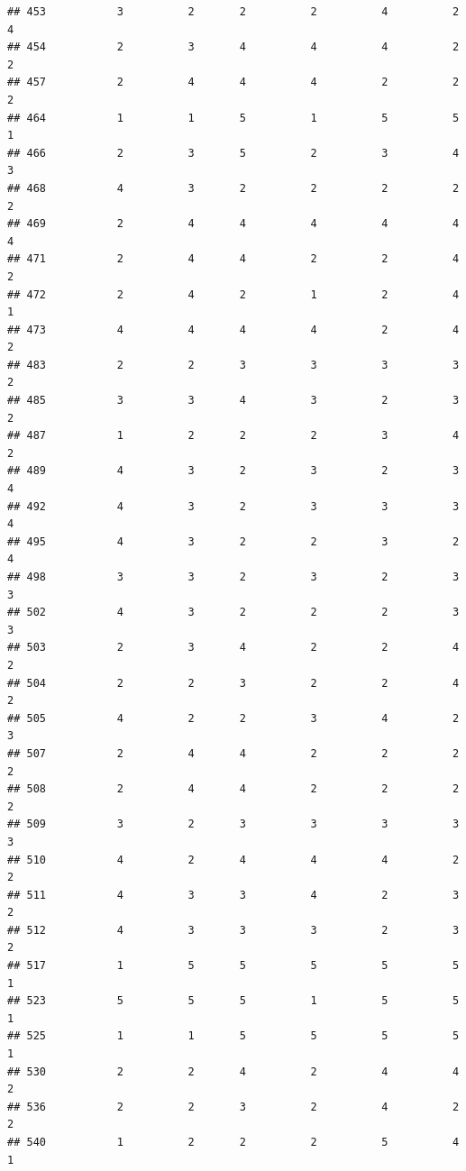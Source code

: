 \documentclass[
]{article}
\begin{document}
\begin{verbatim}
## 453           3          2       2          2          4          2        4
## 454           2          3       4          4          4          2        2
## 457           2          4       4          4          2          2        2
## 464           1          1       5          1          5          5        1
## 466           2          3       5          2          3          4        3
## 468           4          3       2          2          2          2        2
## 469           2          4       4          4          4          4        4
## 471           2          4       4          2          2          4        2
## 472           2          4       2          1          2          4        1
## 473           4          4       4          4          2          4        2
## 483           2          2       3          3          3          3        2
## 485           3          3       4          3          2          3        2
## 487           1          2       2          2          3          4        2
## 489           4          3       2          3          2          3        4
## 492           4          3       2          3          3          3        4
## 495           4          3       2          2          3          2        4
## 498           3          3       2          3          2          3        3
## 502           4          3       2          2          2          3        3
## 503           2          3       4          2          2          4        2
## 504           2          2       3          2          2          4        2
## 505           4          2       2          3          4          2        3
## 507           2          4       4          2          2          2        2
## 508           2          4       4          2          2          2        2
## 509           3          2       3          3          3          3        3
## 510           4          2       4          4          4          2        2
## 511           4          3       3          4          2          3        2
## 512           4          3       3          3          2          3        2
## 517           1          5       5          5          5          5        1
## 523           5          5       5          1          5          5        1
## 525           1          1       5          5          5          5        1
## 530           2          2       4          2          4          4        2
## 536           2          2       3          2          4          2        2
## 540           1          2       2          2          5          4        1

\end{verbatim}
\end{document}
